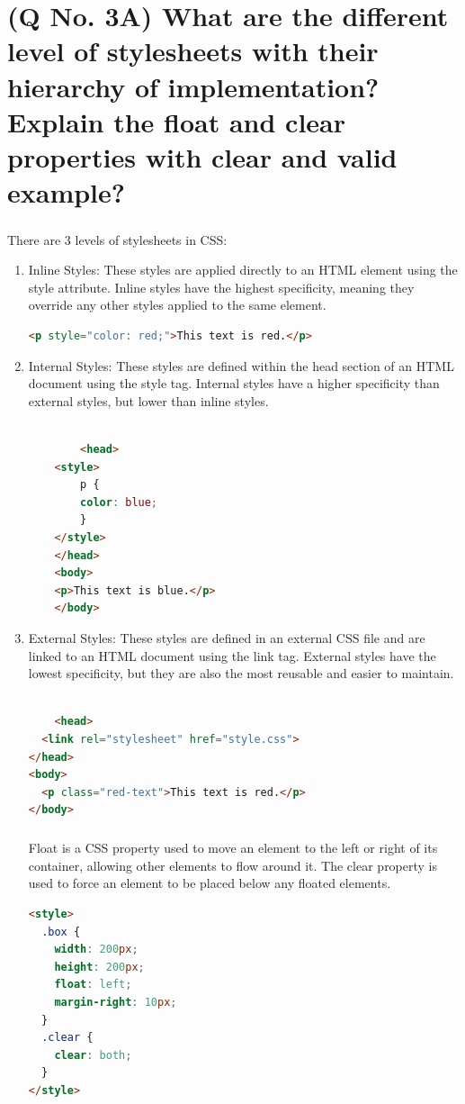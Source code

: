 \documentclass[11pt]{article}
\begin{document}
\section{(Q No. 3A) What are the different level of stylesheets with their hierarchy of implementation? Explain the float and clear properties with clear and valid example?}
\subparagraph{}
There are 3 levels of stylesheets in CSS:
\begin{enumerate}
    \item Inline Styles: These styles are applied directly to an HTML element using the style attribute. Inline styles have the highest specificity, meaning they override any other styles applied to the same element.
    \begin{lstlisting}[language=html, caption=Inline Style]
        <p style="color: red;">This text is red.</p>
    \end{lstlisting} 

    \item Internal Styles: These styles are defined within the head section of an HTML document using the style tag. Internal styles have a higher specificity than external styles, but lower than inline styles.
    \begin{lstlisting}[language=html, caption=Internal Style]

        <head>
    <style>
        p {
        color: blue;
        }
    </style>
    </head>
    <body>
    <p>This text is blue.</p>
    </body>
    \end{lstlisting} 
    
    \item External Styles: These styles are defined in an external CSS file and are linked to an HTML document using the link tag. External styles have the lowest specificity, but they are also the most reusable and easier to maintain.
    \begin{lstlisting}[language=html, caption=External Style]
    
    <head>
  <link rel="stylesheet" href="style.css">
</head>
<body>
  <p class="red-text">This text is red.</p>
</body>
\end{lstlisting} 

\subparagraph{}
Float is a CSS property used to move an element to the left or right of its container, allowing other elements to flow around it. 
The clear property is used to force an element to be placed below any floated elements.
\begin{lstlisting}[language=html, caption=Internal Style]
<style>
  .box {
    width: 200px;
    height: 200px;
    float: left;
    margin-right: 10px;
  }
  .clear {
    clear: both;
  }
</style>


\end{lstlisting}
\end{enumerate}
\end{document}
